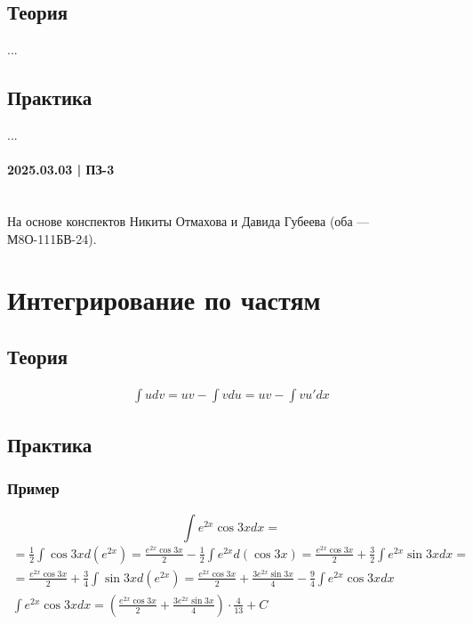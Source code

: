 \documentclass{article}
\begin{document}
\subsection{Теория}
...


\subsection{Практика}
...




\newpage
\paragraph{2025.03.03 | ПЗ-3}
~\\ На основе конспектов Никиты Отмахова и Давида Губеева (оба — М8О-111БВ-24).

\section{Интегрирование по частям}

\subsection{Теория}
\begin{gather*}
    \int udv = uv - \int vdu = uv - \int vu'dx
\end{gather*}


\subsection{Практика}

\subsubsection{Пример}
\[
    \int e^{2x} \cos 3x dx = 
\]
\begin{gather*}
    = \frac{1}{2} \int \cos 3x d(e^{2x}) =
      \frac{e^{2x} \cos 3x}{2} - \frac{1}{2} \int e^{2x} d(\cos 3x) =
      \frac{e^{2x} \cos 3x}{2} + \frac{3}{2} \int e^{2x} \sin 3x dx =                           \\
    = \frac{e^{2x} \cos 3x}{2} + \frac{3}{4} \int \sin 3x d(e^{2x}) =
      \frac{e^{2x} \cos 3x}{2} + \frac{3e^{2x} \sin 3x}{4} - \frac{9}{4} \int e^{2x} \cos 3x dx \\
      \int e^{2x} \cos 3x dx = \left(\frac{e^{2x} \cos 3x}{2} + \frac{3e^{2x} \sin 3x}{4}\right) \cdot \frac{4}{13} + C
\end{gather*}
\end{document}
